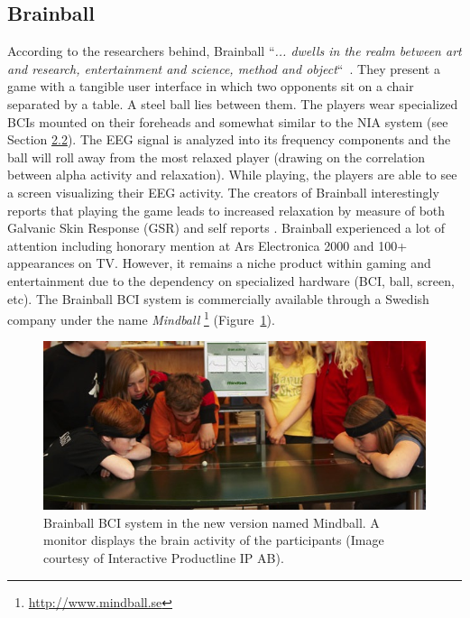 \documentclass[a4paper,10pt,english,lof,lot,twoside]{puthesis}
\begin{document}
\subsection{Brainball}
\label{ch-background/index:ch-background-brain-ball}\label{ch-background/index:brainball}
According to the researchers behind, Brainball ``\emph{... dwells in the realm between
art and research, entertainment and science, method and object}`` \cite{hjelm_research+_2003}. They present a game with a tangible user
interface in which two opponents sit on a chair separated by a table. A steel
ball lies between them. The players wear specialized BCIs
mounted on their foreheads and somewhat similar to the NIA system (see Section
{\hyperref[ch-background/index:ch-background-consumer-bcis]{2.2}}).
The EEG signal is analyzed into its frequency components and the ball
will roll away from the most relaxed player (drawing on the correlation between
alpha activity and relaxation). While playing, the players are able to see a
screen visualizing their EEG activity. The creators of Brainball interestingly
reports that playing the game leads to increased relaxation by measure of both
Galvanic Skin Response (GSR) and self reports
\cite{hjelm_research+_2003}. Brainball experienced a lot of attention
including honorary mention at Ars Electronica 2000 and 100+ appearances on
TV. However, it remains a niche product within gaming and entertainment due to
the dependency on specialized hardware (BCI, ball, screen, etc). The
Brainball BCI system is commercially available through a Swedish
company under the name \emph{Mindball} \footnote{
\href{http://www.mindball.se}{http://www.mindball.se}
} (Figure \ref{ch-background/index:fig-bci-related-mindball-game}).
\begin{figure}[tbp]
\centering
\capstart

\includegraphics[width=0.800\linewidth]{mindball-game.jpg}
\caption[Mindball game]{Brainball BCI system in the new version named Mindball. A
monitor displays the brain activity of the participants (Image courtesy of
Interactive Productline IP AB).}\label{ch-background/index:fig-bci-related-mindball-game}\end{figure}
\end{document}
